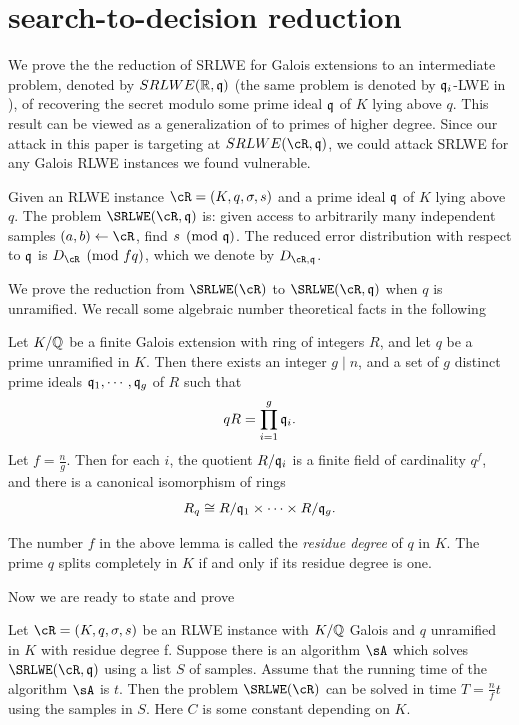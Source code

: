 \documentclass{amsart}
\begin{document}
\section{search-to-decision reduction}
\label{sec: s-to-d}

We prove the the reduction of SRLWE for Galois extensions to an intermediate problem, denoted by $SRLWE(\mathbb{R},\mathfrak{q})$ (the same problem is denoted by $\mathfrak{q}_i$-LWE in \cite{lyubashevsky2013ideal}), of recovering the secret modulo some prime ideal $\mathfrak{q}$ of $K $ lying above $q$. This result can be viewed as a generalization of \cite[Theorem 2]{eisentrager2014weak} to primes of higher degree. Since our attack in this paper is targeting at $SRLWE(\cR,\fq)$, we could attack SRLWE for any Galois RLWE instances we found vulnerable.


\begin{Definition} \label{def: srlwe mod q}
Given an RLWE instance $\cR = (K,q,\sigma, s)$ and a prime ideal $\mathfrak{q}$ of $K$ lying above $q$. The problem $\SRLWE(\cR, \fq)$ is: given access to arbitrarily many independent samples $(a,b) \gets \cR$, find $s \pmod {\mathfrak{q}}$. The reduced error distribution with respect to $\mathfrak{q}$ is $D_{\cR} \pmod{fq}$, which we denote by $D_{\cR,\fq}$.
\end{Definition}

We prove the reduction from $\SRLWE(\cR)$ to $\SRLWE(\cR,\fq)$ when
$q$ is unramified. We recall some algebraic number theoretical facts in the following
\begin{Lemma}
\label{lem: prime factorization}
Let $K/\mathbb{Q}$ be a finite Galois extension with ring of integers $R$,  and let $q$ be a prime unramified in $K$. Then there exists an integer $g \mid n$, and a set of $g$ distinct prime ideals $\mathfrak{q}_1, \cdots ,\mathfrak{q}_g$ of
$R$ such that
\[
    qR = \prod_{i=1}^g \mathfrak{q}_i.
\]
Let $f = \frac{n}{g}$. Then for each $i$, the quotient $R/\mathfrak{q}_{i}$ is a finite field of cardinality $q^f$, and there is a canonical isomorphism of rings
\[
    R_q \cong R/\mathfrak{q}_{1} \times \cdots \times R/\mathfrak{q}_{g}.
\]
\end{Lemma}
The number $f$ in the above lemma is called the {\it residue degree} of $q$ in $K$. The prime $q$ splits completely in $K$ if and only if its residue degree is one.

Now we are ready to state and prove
\begin{theorem} \label{thm: reduction}
Let $\cR = (K,q,\sigma, s)$ be an RLWE instance with $K/\mathbb{Q}$ Galois and $q$ unramified in $K$ with residue degree f. Suppose there is an algorithm $\sA$ which solves $\SRLWE(\cR,\fq)$ using a list $S$ of samples. Assume that the running time of the algorithm $\sA$ is $t$. Then the problem $\SRLWE(\cR)$ can be solved in time $T = \frac{n}{f}t$ using the samples in $S$. Here $C$ is some constant depending on $K$.
\end{theorem}
\end{document}
